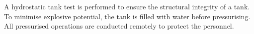 A hydrostatic tank test is performed to ensure the structural integrity of a tank. To minimise explosive potential, the tank is filled with water before pressurising. All pressurised operations are conducted remotely to protect the personnel.
